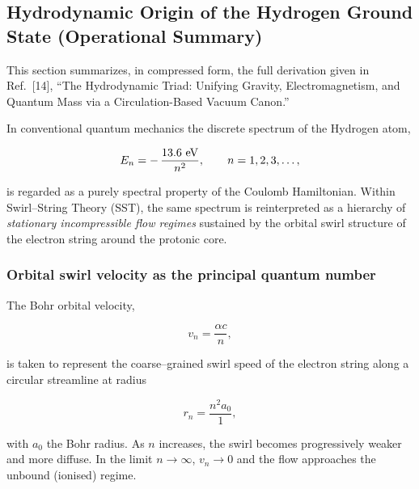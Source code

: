 \documentclass[10pt,reprint,aps,onecolumn,nofootinbib]{revtex4-2}
\begin{document}
\subsection{Hydrodynamic Origin of the Hydrogen Ground State (Operational Summary)}
    \label{sec:SST_hydrogen_groundstate}

    This section summarizes, in compressed form, the full derivation given in Ref.~[14], ``The Hydrodynamic Triad: Unifying Gravity, Electromagnetism, and Quantum Mass via a Circulation-Based Vacuum Canon.''

    In conventional quantum mechanics the discrete spectrum of the Hydrogen
    atom,

    \begin{equation}
        E_n = -\,\frac{13.6~{\rm eV}}{n^2},
        \qquad n=1,2,3,\ldots,
    \end{equation}

    is regarded as a purely spectral property of the Coulomb Hamiltonian.
    Within Swirl--String Theory (SST), the same spectrum is reinterpreted as
    a hierarchy of \emph{stationary incompressible flow regimes} sustained
    by the orbital swirl structure of the electron string around the
    protonic core.

    \subsubsection*{Orbital swirl velocity as the principal quantum number}

        The Bohr orbital velocity,

        \begin{equation}
            v_n = \frac{\alpha c}{n},
        \end{equation}

        is taken to represent the coarse--grained swirl speed of the electron
        string along a circular streamline at radius

        \begin{equation}
            r_n = \frac{n^2 a_0}{1},
        \end{equation}

        with $a_0$ the Bohr radius. As $n$ increases, the swirl becomes
        progressively weaker and more diffuse. In the limit $n\to\infty$,
        $v_n\to 0$ and the flow approaches the unbound (ionised) regime.
\end{document}
